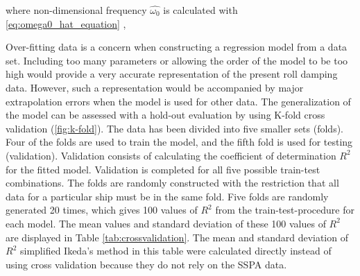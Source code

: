 \noindent where non-dimensional frequency $\hat{\omega_0}$ is calculated with \autoref{eq:omega0_hat_equation} \cite{himeno_prediction_1981},


\noindent Over-fitting data is a concern when constructing a regression model from a data set. Including too many parameters or allowing the order of the model to be too high would provide a very accurate representation of the present roll damping data. However, such a representation would be accompanied by major extrapolation errors when the model is used for other data. The generalization of the model can be assessed with a hold-out evaluation by using K-fold cross validation \cite{mosteller_data_1968} (\autoref{fig:k-fold}). The data has been divided into five smaller sets (folds). Four of the folds are used to train the model, and the fifth fold is used for testing (validation). Validation consists of calculating the coefficient of determination $R^2$ for the fitted model. Validation is completed for all five possible train-test combinations. 
The folds are randomly constructed with the restriction that all data for a particular ship must be in the same fold. Five folds are randomly generated 20 times, which gives 100 values of $R^2$ from the train-test-procedure for each model. The mean values and standard deviation of these 100 values of $R^2$ are displayed in Table \ref{tab:crossvalidation}. The mean and standard deviation of $R^2$ simplified Ikeda's method in this table were calculated directly instead of using cross validation because they do not rely on the SSPA data.

